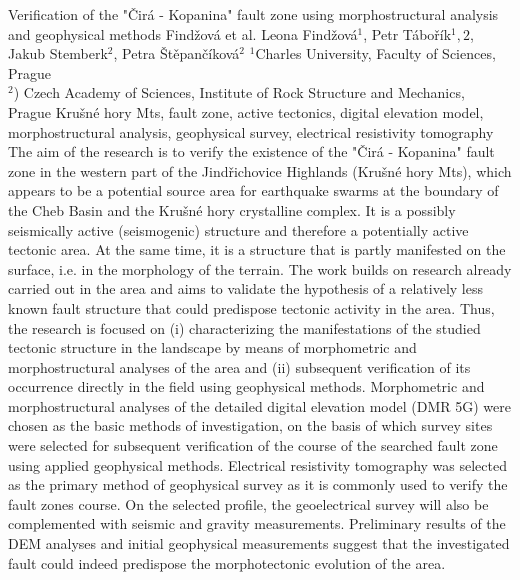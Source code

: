 \abstract
{Verification of the "Čirá - Kopanina" fault zone using morphostructural analysis and geophysical methods} %
{Findžová et al.} %
{Leona Findžová$^1$, Petr Tábořík$^1,2$, Jakub Stemberk$^2$, Petra Štěpančíková$^2$} %
{\KLtag} %
{$^1$Charles University, Faculty of Sciences, Prague\\
	$^2$) Czech Academy of Sciences, Institute of Rock Structure and Mechanics, Prague
} %
{}  %
{Krušné hory Mts, fault zone, active tectonics, digital elevation model, morphostructural analysis, geophysical survey, electrical resistivity tomography}%
{The aim of the research is to verify the existence of the "Čirá - Kopanina" fault zone in the western part of the Jindřichovice Highlands (Krušné hory Mts), which appears to be a potential source area for earthquake swarms at the boundary of the Cheb Basin and the Krušné hory crystalline complex. It is a possibly seismically active (seismogenic) structure and therefore a potentially active tectonic area. At the same time, it is a structure that is partly manifested on the surface, i.e. in the morphology of the terrain. The work builds on research already carried out in the area and aims to validate the hypothesis of a relatively less known fault structure that could predispose tectonic activity in the area. Thus, the research is focused on (i) characterizing the manifestations of the studied tectonic structure in the landscape by means of morphometric and morphostructural analyses of the area and (ii) subsequent verification of its occurrence directly in the field using geophysical methods. Morphometric and morphostructural analyses of the detailed digital elevation model (DMR 5G) were chosen as the basic methods of investigation, on the basis of which survey sites were selected for subsequent verification of the course of the searched fault zone using applied geophysical methods. Electrical resistivity tomography was selected as the primary method of geophysical survey as it is commonly used to verify the fault zones course. On the selected profile, the geoelectrical survey will also be complemented with seismic and gravity measurements. Preliminary results of the DEM analyses and initial geophysical measurements suggest that the investigated fault could indeed predispose the morphotectonic evolution of the area.
}%
{}%


